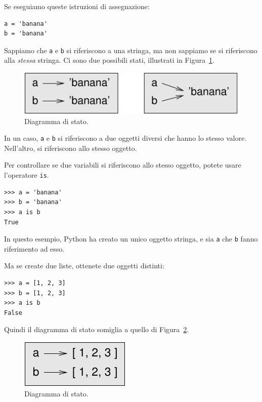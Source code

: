 \documentclass[10pt]{book}
\begin{document}
Se eseguiamo queste istruzioni di assegnazione:

\begin{verbatim}
a = 'banana'
b = 'banana'
\end{verbatim}
%
Sappiamo che {\tt a} e {\tt b} si riferiscono a una stringa, ma non sappiamo se si riferiscono alla {\em stessa} stringa.
Ci sono due possibili stati, illustrati in Figura~\ref{fig.list1}.

\begin{figure}
\centerline
{\includegraphics[scale=0.8]{figs/list1.pdf}}
\caption{Diagramma di stato.}
\label{fig.list1}
\end{figure}


In un caso, {\tt a} e {\tt b} si riferiscono a due oggetti diversi che hanno lo stesso valore. Nell'altro, si riferiscono allo stesso oggetto.

Per controllare se due variabili si riferiscono allo stesso oggetto, potete usare l'operatore {\tt is}.

\begin{verbatim}
>>> a = 'banana'
>>> b = 'banana'
>>> a is b
True
\end{verbatim}
%
In questo esempio, Python ha creato un unico oggetto stringa, e sia {\tt a} che {\tt b} fanno riferimento ad esso.

Ma se create due liste, ottenete due oggetti distinti:

\begin{verbatim}
>>> a = [1, 2, 3]
>>> b = [1, 2, 3]
>>> a is b
False
\end{verbatim}
%
Quindi il diagramma di stato somiglia a quello di Figura~\ref{fig.list2}.

\begin{figure}
\centerline
{\includegraphics[scale=0.8]{figs/list2.pdf}}
\caption{Diagramma di stato.}
\label{fig.list2}
\end{figure}
\end{document}
